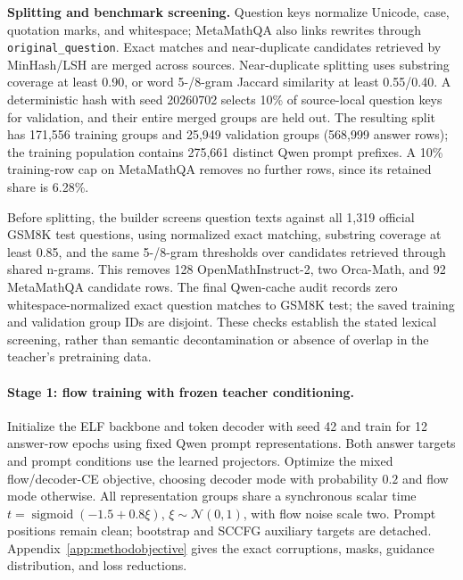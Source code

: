 \documentclass[11pt,letterpaper]{article}
\begin{document}
\textbf{Splitting and benchmark screening.} Question keys normalize Unicode, case, quotation marks, and whitespace; MetaMathQA also links rewrites through \texttt{original\_question}. Exact matches and near-duplicate candidates retrieved by MinHash/LSH are merged across sources. Near-duplicate splitting uses substring coverage at least 0.90, or word 5-/8-gram Jaccard similarity at least 0.55/0.40. A deterministic hash with seed 20260702 selects 10\% of source-local question keys for validation, and their entire merged groups are held out. The resulting split has 171,556 training groups and 25,949 validation groups (568,999 answer rows); the training population contains 275,661 distinct Qwen prompt prefixes. A 10\% training-row cap on MetaMathQA removes no further rows, since its retained share is 6.28\%.

Before splitting, the builder screens question texts against all 1,319 official GSM8K test questions, using normalized exact matching, substring coverage at least 0.85, and the same 5-/8-gram thresholds over candidates retrieved through shared n-grams. This removes 128 OpenMathInstruct-2, two Orca-Math, and 92 MetaMathQA candidate rows. The final Qwen-cache audit records zero whitespace-normalized exact question matches to GSM8K test; the saved training and validation group IDs are disjoint. These checks establish the stated lexical screening, rather than semantic decontamination or absence of overlap in the teacher's pretraining data.

\paragraph{Stage 1: flow training with frozen teacher conditioning.}
Initialize the ELF backbone and token decoder with seed 42 and train for 12 answer-row epochs using fixed Qwen prompt representations. Both answer targets and prompt conditions use the learned projectors. Optimize the mixed flow/decoder-CE objective, choosing decoder mode with probability $0.2$ and flow mode otherwise. All representation groups share a synchronous scalar time $t=\operatorname{sigmoid}(-1.5+0.8\xi)$, $\xi\sim\mathcal N(0,1)$, with flow noise scale two. Prompt positions remain clean; bootstrap and SCCFG auxiliary targets are detached. Appendix~\ref{app:methodobjective} gives the exact corruptions, masks, guidance distribution, and loss reductions.
\end{document}
